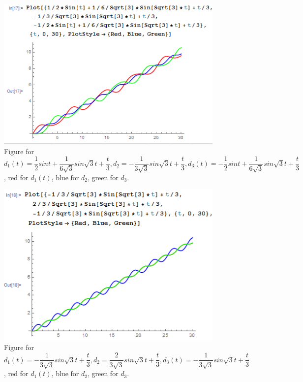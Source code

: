\documentclass[a4paper,12pt,titlepage]{article}
\begin{document}
\begin{figure}[H]
    \centering
    \includegraphics[width=11
    cm]{57.png}
    \caption{Figure for $d_1
    (t)=\dfrac{1}{2}sint+\dfrac{1}{6\sqrt{3}}sin\sqrt{3}t+\dfrac{t}{3},d_2=-\dfrac{1}{3\sqrt{3}}sin\sqrt{3}t+\dfrac{t}{3},d_3(t)=-\dfrac{1}{2}sint+\dfrac{1}{6\sqrt{3}}sin\sqrt{3}t+\dfrac{t}{3}$, red for $d_1(t)$, blue for $d_2$, green for $d_3$.}
\end{figure}


\begin{figure}[H]
    \centering
    \includegraphics[width=11
    cm]{58.png}
    \caption{Figure for $d_1
    (t)=-\dfrac{1}{3\sqrt{3}}sin\sqrt{3}t+\dfrac{t}{3},d_2=\dfrac{2}{3\sqrt{3}}sin\sqrt{3}t+\dfrac{t}{3},d_3(t)=-\dfrac{1}{3\sqrt{3}}sin\sqrt{3}t+\dfrac{t}{3}$, red for $d_1(t)$, blue for $d_2$, green for $d_3$.}
\end{figure}
\end{document}
